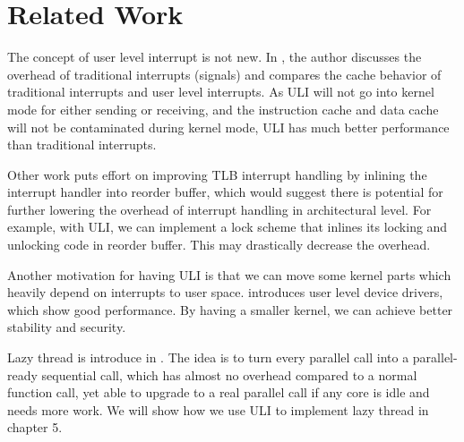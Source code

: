 \section{Related Work}

The concept of user level interrupt is not new. In \cite{parker}, the author discusses the overhead of traditional interrupts (signals) and compares the cache behavior of traditional interrupts and user level interrupts. As ULI will not go into kernel mode for either sending or receiving, and the instruction cache and data cache will not be contaminated during kernel mode, ULI has much better performance than traditional interrupts. 

Other work \cite{jaleel} puts effort on improving TLB interrupt handling by inlining the interrupt handler into reorder buffer, which would suggest there is potential for further lowering the overhead of interrupt handling in architectural level. For example, with ULI, we can implement a lock scheme that inlines its locking and unlocking code in reorder buffer. This may drastically decrease the overhead.

Another motivation for having ULI is that we can move some kernel parts which heavily depend on interrupts to user space. \cite{leslie} introduces user level device drivers, which show good performance. By having a smaller kernel, we can achieve better stability and security.

Lazy thread is introduce in \cite{goldstein}. The idea is to turn every parallel call into a parallel-ready sequential call, which has almost no overhead compared to a normal function call, yet able to upgrade to a real parallel call if any core is idle and needs more work. We will show how we use ULI to implement lazy thread in chapter 5.



